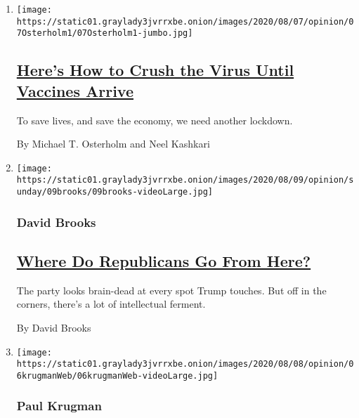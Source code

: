 \begin{enumerate}
\def\labelenumi{\arabic{enumi}.}
\item
  \texttt{[image: https://static01.graylady3jvrrxbe.onion/images/2020/08/07/opinion/07Osterholm1/07Osterholm1-jumbo.jpg]}

  \hypertarget{heres-how-to-crush-the-virus-until-vaccines-arrive}{%
  \subsection{\texorpdfstring{\href{/2020/08/07/opinion/coronavirus-lockdown-unemployment-death.html}{Here's
  How to Crush the Virus Until Vaccines
  Arrive}}{Here's How to Crush the Virus Until Vaccines Arrive}}\label{heres-how-to-crush-the-virus-until-vaccines-arrive}}

  To save lives, and save the economy, we need another lockdown.

  By Michael T. Osterholm and Neel Kashkari
\item
  \texttt{[image: https://static01.graylady3jvrrxbe.onion/images/2020/08/09/opinion/sunday/09brooks/09brooks-videoLarge.jpg]}

  \hypertarget{david-brooks}{%
  \subsubsection{David Brooks}\label{david-brooks}}

  \hypertarget{where-do-republicans-go-from-here}{%
  \subsection{\texorpdfstring{\href{/2020/08/07/opinion/sunday/republican-party-trump-2020.html}{Where
  Do Republicans Go From
  Here?}}{Where Do Republicans Go From Here?}}\label{where-do-republicans-go-from-here}}

  The party looks brain-dead at every spot Trump touches. But off in the
  corners, there's a lot of intellectual ferment.

  By David Brooks
\item
  \texttt{[image: https://static01.graylady3jvrrxbe.onion/images/2020/08/08/opinion/06krugmanWeb/06krugmanWeb-videoLarge.jpg]}

  \hypertarget{paul-krugman}{%
  \subsubsection{Paul Krugman}\label{paul-krugman}}


\end{enumerate}
